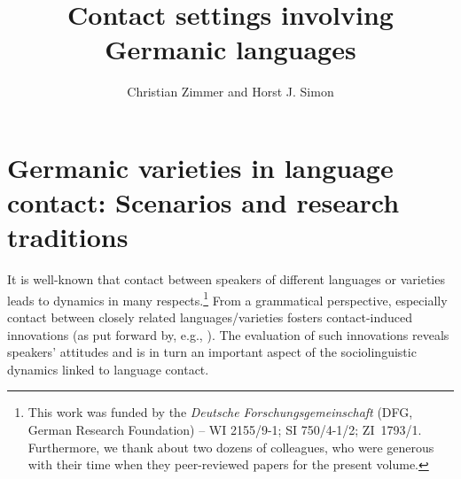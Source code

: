 \documentclass[output=paper]{langsci/langscibook}
\author{Christian Zimmer\affiliation{Freie Universität Berlin} and Horst J. Simon\affiliation{Freie Universität Berlin}}
\title{Contact settings involving Germanic languages}
\begin{document}
\maketitle

\section{Germanic varieties in language contact: Scenarios and research traditions} %
\label{sec:zimmer:1}

It is well-known that contact between speakers of different languages or varieties leads to dynamics in many respects.\footnote{This work was funded by the \textit{Deutsche} \textit{Forschungsgemeinschaft} (DFG, German Research Foundation) – WI 2155/9-1; SI 750/4-1/2; ZI~1793/1. Furthermore, we thank about two dozens of colleagues, who were generous with their time when they peer-reviewed papers for the present volume.} From a grammatical perspective, especially contact between closely related languages/varieties fosters contact-induced innovations (as put forward by, e.g., \citealt{thomason_contact-induced_2014}). The evaluation of such innovations reveals speakers’ attitudes and is in turn an important aspect of the sociolinguistic dynamics linked to language contact. 
\end{document}
